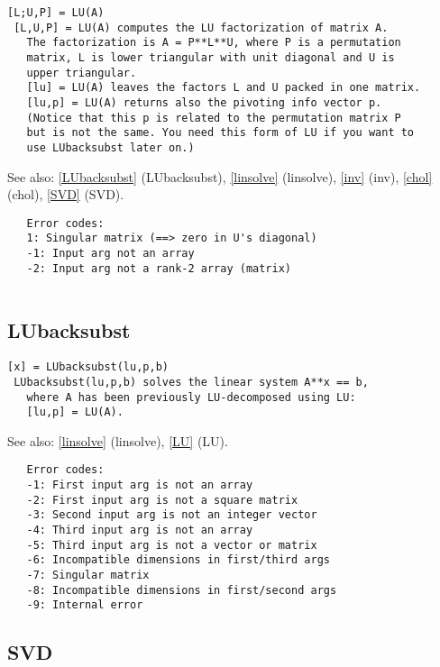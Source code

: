 \documentclass[a4paper]{article}
\begin{document}
\begin{tscreen}
\begin{verbatim}
[L;U,P] = LU(A)
 [L,U,P] = LU(A) computes the LU factorization of matrix A.
   The factorization is A = P**L**U, where P is a permutation
   matrix, L is lower triangular with unit diagonal and U is
   upper triangular.
   [lu] = LU(A) leaves the factors L and U packed in one matrix.
   [lu,p] = LU(A) returns also the pivoting info vector p.
   (Notice that this p is related to the permutation matrix P
   but is not the same. You need this form of LU if you want to
   use LUbacksubst later on.)
\end{verbatim}

See also: \ref{LUbacksubst} {(LUbacksubst)}, \ref{linsolve} {(linsolve)}, \ref{inv} {(inv)}, \ref{chol} {(chol)}, \ref{SVD} {(SVD)}.
\begin{verbatim}
   Error codes:
   1: Singular matrix (==> zero in U's diagonal)
   -1: Input arg not an array
   -2: Input arg not a rank-2 array (matrix)
   
\end{verbatim}
\end{tscreen}



\subsection{LUbacksubst\label{LUbacksubst}}

\begin{tscreen}
\begin{verbatim}
[x] = LUbacksubst(lu,p,b)
 LUbacksubst(lu,p,b) solves the linear system A**x == b,
   where A has been previously LU-decomposed using LU:
   [lu,p] = LU(A).
\end{verbatim}

See also: \ref{linsolve} {(linsolve)}, \ref{LU} {(LU)}.
\begin{verbatim}
   Error codes:
   -1: First input arg is not an array
   -2: First input arg is not a square matrix
   -3: Second input arg is not an integer vector
   -4: Third input arg is not an array
   -5: Third input arg is not a vector or matrix
   -6: Incompatible dimensions in first/third args
   -7: Singular matrix
   -8: Incompatible dimensions in first/second args
   -9: Internal error
\end{verbatim}
\end{tscreen}



\subsection{SVD\label{SVD}}
\end{document}
